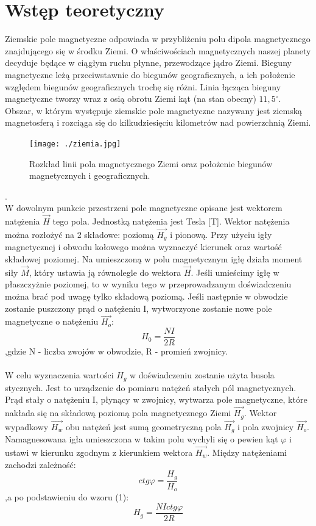\documentclass[a4paper,10pt]{article}
\begin{document}
\section{Wstęp teoretyczny}
Ziemskie pole magnetyczne odpowiada w przybliżeniu polu dipola magnetycznego znajdującego się w środku Ziemi. O właściwościach magnetycznych naszej planety decyduje będące w ciągłym ruchu płynne, przewodzące jądro Ziemi. Bieguny magnetyczne leżą przeciwstawnie do biegunów geograficznych, a ich położenie względem biegunów geograficznych trochę się różni. Linia łącząca bieguny magnetyczne tworzy wraz z osią obrotu Ziemi kąt (na stan obecny) $11,5^\circ$.  Obszar, w którym występuje ziemskie pole magnetyczne nazywany jest ziemską magnetosferą i rozciąga się do kilkudziesięciu kilometrów nad powierzchnią Ziemi.
\begin{figure}[H]
\centering
  \texttt{[image: ./ziemia.jpg]}
  \caption{Rozkład linii pola magnetycznego Ziemi oraz położenie biegunów magnetycznych i geograficznych.}
  \label{}
\end{figure}.
\\W dowolnym punkcie przestrzeni pole magnetyczne opisane jest wektorem natężenia $\vec{H}$ tego pola. Jednostką natężenia jest Tesla [T]. Wektor natężenia można rozłożyć na 2 składowe: poziomą $\vec{H_g}$ i pionową. Przy użyciu igły magnetycznej i obwodu kołowego można wyznaczyć kierunek oraz wartość składowej poziomej. Na umieszczoną w polu magnetycznym igłę działa moment siły $\vec{M}$, który ustawia ją równolegle do wektora $\vec{H}$. Jeśli umieścimy igłę w płaszczyżnie poziomej, to w wyniku tego w przeprowadzanym doświadczeniu można brać pod uwagę tylko składową poziomą. Jeśli następnie w obwodzie zostanie puszczony prąd o natężeniu I, wytworzyone zostanie nowe pole magnetyczne o natężeniu $\vec{H_o}$:
\begin{equation}
H_0 = \frac{NI}{2R}
\end{equation}
,gdzie N - liczba zwojów w obwodzie, R - promień zwojnicy.
\\
\\W celu wyznaczenia wartości $H_g$ w doświadczeniu zostanie użyta busola stycznych. Jest to urządzenie do pomiaru natężeń stałych pól magnetycznych. Prąd stały o natężeniu I, płynący w zwojnicy, wytwarza pole magnetyczne, które nakłada się na składową poziomą pola magnetycznego Ziemi $\vec{H_g}$. Wektor wypadkowy $\vec{H_w}$ obu natężeń jest sumą geometryczną pola $\vec{H_g}$ i pola zwojnicy $\vec{H_o}$. Namagnesowana igła umieszczona w takim polu wychyli się o pewien kąt $\varphi$ i ustawi w kierunku zgodnym z kierunkiem wektora $\vec{H_w}$. Między natężeniami zachodzi zależność:
\begin{equation}
ctg\varphi = \frac{H_g}{H_o}
\end{equation}
,a po podstawieniu do wzoru (1):
\begin{equation}
H_g = \frac{NIctg\varphi}{2R}
\end{equation}
\end{document}
